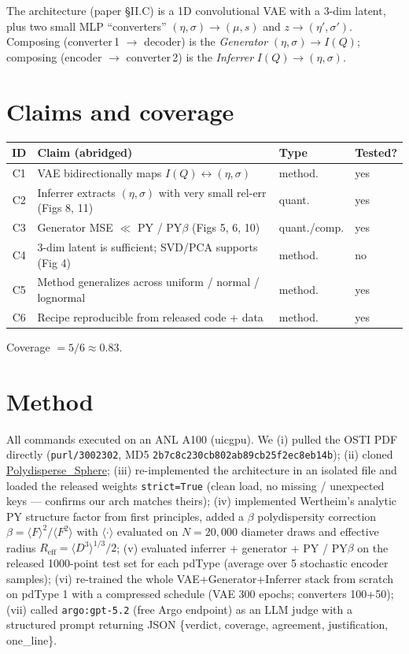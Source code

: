 \documentclass[11pt]{article}
\begin{document}
The architecture (paper \S II.C) is a 1D convolutional VAE with a 3-dim
latent, plus two small MLP ``converters'' $(\eta,\sigma)\!\to\!(\mu,s)$ and
$z\!\to\!(\eta',\sigma')$. Composing (converter\,1 $\to$ decoder) is the
\emph{Generator} $(\eta,\sigma)\!\to\!I(Q)$; composing (encoder $\to$
converter\,2) is the \emph{Inferrer} $I(Q)\!\to\!(\eta,\sigma)$.

\section{Claims and coverage}
\begin{center}
\begin{tabular}{clll}
\toprule
ID & Claim (abridged) & Type & Tested? \\
\midrule
C1 & VAE bidirectionally maps $I(Q)\!\leftrightarrow\!(\eta,\sigma)$ & method. & yes \\
C2 & Inferrer extracts $(\eta,\sigma)$ with very small rel-err (Figs 8, 11) & quant. & yes \\
C3 & Generator MSE $\ll$ PY / PY$\beta$ (Figs 5, 6, 10) & quant./comp. & yes \\
C4 & 3-dim latent is sufficient; SVD/PCA supports (Fig 4) & method. & no \\
C5 & Method generalizes across uniform / normal / lognormal & method. & yes \\
C6 & Recipe reproducible from released code + data & method. & yes \\
\bottomrule
\end{tabular}
\end{center}
Coverage $= 5/6 \approx 0.83$.

\section{Method}
All commands executed on an ANL A100 (uicgpu). We (i) pulled the OSTI PDF
directly (\texttt{purl/3002302}, MD5
\texttt{2b7c8c230cb802ab89cb25f2ec8eb14b}); (ii) cloned
\href{https://github.com/ljding94/Polydisperse\_Sphere}{Polydisperse\_Sphere};
(iii) re-implemented the architecture in an isolated file and loaded the
released weights \texttt{strict=True} (clean load, no missing / unexpected
keys --- confirms our arch matches theirs); (iv) implemented Wertheim's
analytic PY structure factor from first principles, added a $\beta$
polydispersity correction $\beta = \langle F\rangle^2 / \langle F^2\rangle$
with $\langle\cdot\rangle$ evaluated on $N\!=\!20{,}000$ diameter draws and
effective radius $R_\mathrm{eff}=\langle D^3\rangle^{1/3}/2$; (v) evaluated
inferrer + generator + PY / PY$\beta$ on the released 1000-point test set
for each pdType (average over 5 stochastic encoder samples); (vi)
re-trained the whole VAE+Generator+Inferrer stack from scratch on pdType 1
with a compressed schedule (VAE 300 epochs; converters 100+50); (vii)
called \texttt{argo:gpt-5.2} (free Argo endpoint) as an LLM judge with a
structured prompt returning JSON \{verdict, coverage, agreement,
justification, one\_line\}.
\end{document}
